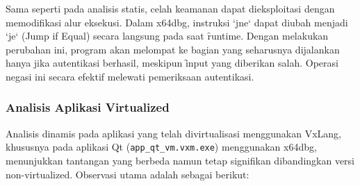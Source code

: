 Sama seperti pada analisis statis, celah keamanan dapat dieksploitasi dengan memodifikasi alur eksekusi. Dalam x64dbg, instruksi `jne` dapat diubah menjadi `je` (Jump if Equal) secara langsung pada saat \f{runtime}. Dengan melakukan perubahan ini, program akan melompat ke bagian yang seharusnya dijalankan hanya jika autentikasi berhasil, meskipun \f{input} yang diberikan salah. Operasi negasi ini secara efektif melewati pemeriksaan autentikasi.

\subsubsection{Analisis Aplikasi Virtualized}

Analisis dinamis pada aplikasi yang telah divirtualisasi menggunakan VxLang, khususnya pada aplikasi Qt (\texttt{app\_qt\_vm.vxm.exe}) menggunakan x64dbg, menunjukkan tantangan yang berbeda namun tetap signifikan dibandingkan versi non-virtualized. Observasi utama adalah sebagai berikut:

